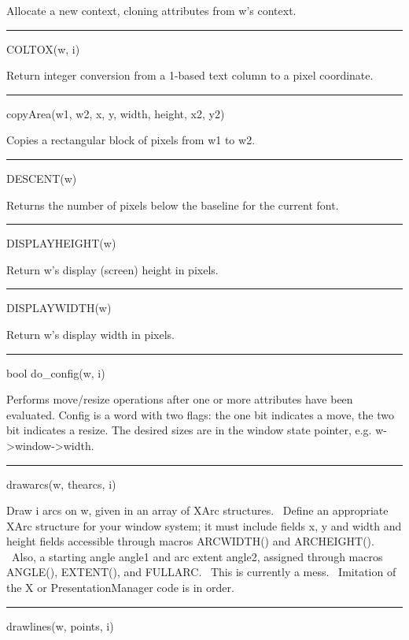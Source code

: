 Allocate a new context, cloning attributes from w's context.

{\sffamily\bfseries
\bigskip\hrule\vspace{0.1cm}
\noindent
COLTOX(w, i)}


Return integer conversion from a 1-based text column to a pixel coordinate.

{\sffamily\bfseries
\bigskip\hrule\vspace{0.1cm}
\noindent
copyArea(w1, w2, x, y, width, height, x2, y2)}


Copies a rectangular block of pixels from w1 to w2.

{\sffamily\bfseries
\bigskip\hrule\vspace{0.1cm}
\noindent
DESCENT(w)}


Returns the number of pixels below the baseline for the current font.


\bigskip\hrule\vspace{0.1cm}
\noindent
DISPLAYHEIGHT(w)


Return w's display (screen) height in pixels.

{\sffamily\bfseries
\bigskip\hrule\vspace{0.1cm}
\noindent
DISPLAYWIDTH(w)}


Return w's display width in pixels.

{\sffamily\bfseries
\bigskip\hrule\vspace{0.1cm}
\noindent
bool do\_config(w, i)}


Performs move/resize operations after one or more attributes have been
evaluated. Config is a word with two flags: the one bit indicates a
move, the two bit indicates a resize. The desired sizes are in the
window state pointer, e.g.
w-{\textgreater}window-{\textgreater}width.

{\sffamily\bfseries
\bigskip\hrule\vspace{0.1cm}
\noindent
drawarcs(w, thearcs, i)}


Draw i arcs on w, given in an array of XArc structures. \ Define an appropriate XArc structure for your window system;
it must include fields x, y and width and height fields accessible through macros \textsf{ARCWIDTH()} and
\textsf{ARCHEIGHT()}. \ Also, a starting angle angle1 and arc extent angle2, assigned through macros \textsf{ANGLE()},
\textsf{EXTENT()}, and \textsf{FULLARC}. \ This is currently a mess. \ Imitation of the X or PresentationManager code
is in order.


\bigskip\hrule\vspace{0.1cm}
\noindent
drawlines(w, points, i)


